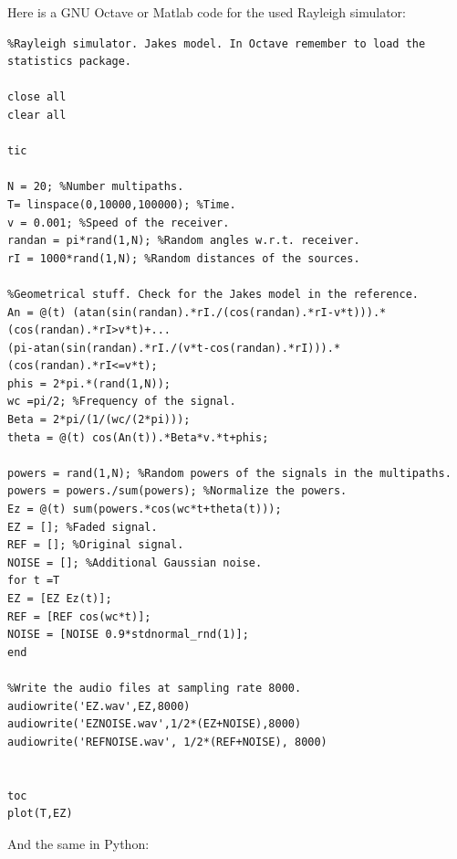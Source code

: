 \documentclass{article}
\begin{document}
Here is a GNU Octave or Matlab code for the used Rayleigh simulator:
\begin{verbatim}
%Rayleigh simulator. Jakes model. In Octave remember to load the statistics package.

close all
clear all

tic

N = 20; %Number multipaths.
T= linspace(0,10000,100000); %Time.
v = 0.001; %Speed of the receiver.
randan = pi*rand(1,N); %Random angles w.r.t. receiver.
rI = 1000*rand(1,N); %Random distances of the sources.

%Geometrical stuff. Check for the Jakes model in the reference.
An = @(t) (atan(sin(randan).*rI./(cos(randan).*rI-v*t))).*(cos(randan).*rI>v*t)+...
(pi-atan(sin(randan).*rI./(v*t-cos(randan).*rI))).*(cos(randan).*rI<=v*t);
phis = 2*pi.*(rand(1,N));
wc =pi/2; %Frequency of the signal.
Beta = 2*pi/(1/(wc/(2*pi)));
theta = @(t) cos(An(t)).*Beta*v.*t+phis;

powers = rand(1,N); %Random powers of the signals in the multipaths.
powers = powers./sum(powers); %Normalize the powers.
Ez = @(t) sum(powers.*cos(wc*t+theta(t)));
EZ = []; %Faded signal.
REF = []; %Original signal.
NOISE = []; %Additional Gaussian noise.
for t =T
EZ = [EZ Ez(t)];
REF = [REF cos(wc*t)];
NOISE = [NOISE 0.9*stdnormal_rnd(1)];
end

%Write the audio files at sampling rate 8000.
audiowrite('EZ.wav',EZ,8000)
audiowrite('EZNOISE.wav',1/2*(EZ+NOISE),8000)
audiowrite('REFNOISE.wav', 1/2*(REF+NOISE), 8000)


toc
plot(T,EZ)
\end{verbatim}


And the same in Python:
\end{document}
